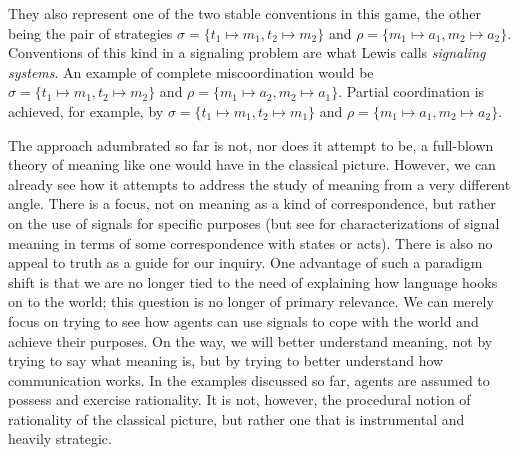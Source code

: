 \documentclass[a4paper]{article}
\begin{document}
They also represent one of the two stable conventions in this game, the other being the pair of strategies $\sigma = \lbrace t_1 \mapsto m_1, t_2 \mapsto m_2 \rbrace$ and $\rho = \lbrace m_1 \mapsto a_1, m_2 \mapsto a_2 \rbrace$.
Conventions of this kind in a signaling problem are what Lewis calls \emph{signaling systems}.
An example of complete miscoordination would be $\sigma = \lbrace t_1 \mapsto m_1, t_2 \mapsto m_2 \rbrace$ and $\rho = \lbrace m_1 \mapsto a_2, m_2 \mapsto a_1 \rbrace$.
Partial coordination is achieved, for example, by $\sigma = \lbrace t_1 \mapsto m_1, t_2 \mapsto m_1 \rbrace$ and $\rho = \lbrace m_1 \mapsto a_1, m_2 \mapsto a_2 \rbrace$.

The approach adumbrated so far is not, nor does it attempt to be, a full-blown theory of meaning like one would have in the classical picture.
However, we can already see how it attempts to address the study of meaning from a very different angle.
There is a focus, not on meaning as a kind of correspondence, but rather on the use of signals for specific purposes (but see \cite{Hutteger:2007_Evol_Indicatives_Imperatives,Harms2010:Determining-tru,skyrms_signals_2010,Franke2013:An-adaptationis} for characterizations of signal meaning in terms of some correspondence with states or acts).
There is also no appeal to truth as a guide for our inquiry.
One advantage of such a paradigm shift is that we are no longer tied to the need of explaining how language hooks on to the world; this question is no longer of primary relevance.
We can merely focus on trying to see how agents can use signals to cope with the world and achieve their purposes.
On the way, we will better understand meaning, not by trying to say what meaning is, but by trying to better understand how communication works.
In the examples discussed so far, agents are assumed to possess and exercise rationality.
It is not, however, the procedural notion of rationality of the classical picture, but rather one that is instrumental and heavily strategic.
\end{document}

